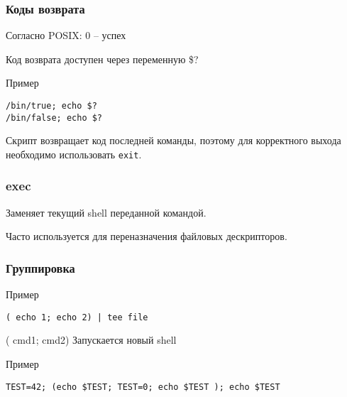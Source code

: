 \begin{frame}[fragile]
	\frametitle{Коды возврата}

	Согласно POSIX: 0 -- успех

	Код возврата доступен через переменную \$?

	\pause
	\begin{block}{Пример}
		\begin{lstlisting}
/bin/true; echo $?
/bin/false; echo $?
		\end{lstlisting}
	\end{block}

	Скрипт возвращает код последней команды, поэтому для корректного выхода необходимо использовать {\tt exit}.

\end{frame}


\begin{frame}
	\frametitle{exec}

	Заменяет текущий shell переданной командой. 

	Часто используется для переназначения файловых дескрипторов.

\end{frame}

\begin{frame}[fragile]
	\frametitle{Группировка}
	
	\begin{block}{Пример}
		\begin{lstlisting}
( echo 1; echo 2) | tee file
		\end{lstlisting}
	\end{block}

	\pause
	\begin{block}{( cmd1; cmd2)}
	    Запускается новый shell
	\end{block}

	\begin{block}{Пример}
		\begin{lstlisting}
TEST=42; (echo $TEST; TEST=0; echo $TEST ); echo $TEST
		\end{lstlisting}
	\end{block}

\end{frame}


